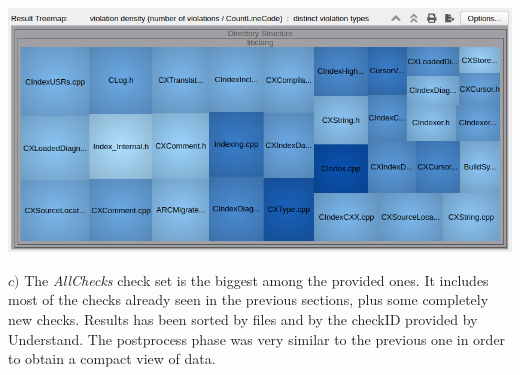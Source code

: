 \begin{minipage}{\linewidth}
	\includegraphics[width=\textwidth]{img/SciToolsViolationsRatio.png}
\end{minipage}

\pagebreak

\hspace{-0.6cm} \textbf{$c)$}  
The \textsl{AllChecks} check set is the biggest among the provided ones. It includes most of the checks already seen in the previous sections, plus some completely new checks.\newline
Results has been sorted by files and by the checkID provided by Understand. The postprocess phase was very similar to the previous one in order to obtain a compact view of data.\newline

